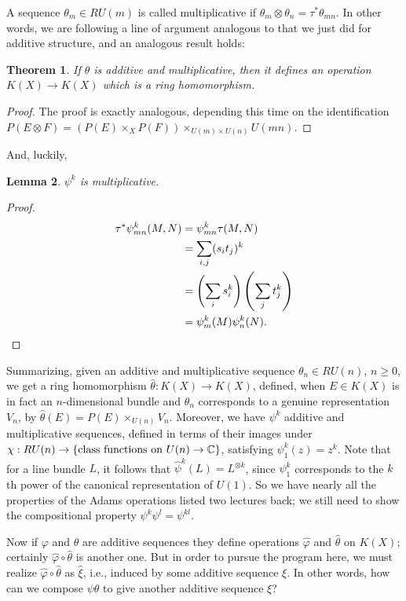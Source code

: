 \documentclass{article}
\newcommand{\C}{\mathbb{C}}
\newtheorem{thm}{Theorem}[section]
\newtheorem{lem}[thm]{Lemma}
\begin{document}
A sequence $\theta_m \in RU(m)$ is called multiplicative if $\theta_m \otimes \theta_n = \tau^* \theta_{mn}$.  In other words, we are following a line of argument analogous to that we just did for additive structure, and an analogous result holds:
\begin{thm}
If $\theta$ is additive and multiplicative, then it defines an operation $K(X) \to K(X)$ which is a ring homomorphism.
\end{thm}
\begin{proof}
The proof is exactly analogous, depending this time on the identification $P(E \otimes F) = (P(E) \times_X P(F)) \times_{U(m) \times U(n)} U(mn)$.
\end{proof}

And, luckily,
\begin{lem}
$\psi^k$ is multiplicative.
\end{lem}
\begin{proof}
\begin{align*}
\tau^* \psi^k_{mn}(M, N) & = \psi^k_{mn} \tau(M, N) \\
& = \sum_{i, j}(s_i t_j)^k \\
& = \left( \sum_i s_i^k \right) \left( \sum_j t_j^k \right) \\
& = \psi^k_m(M) \psi^k_n(N).\qedhere
\end{align*}
\end{proof}

Summarizing, given an additive and multiplicative sequence $\theta_n \in RU(n)$, $n \ge 0$, we get a ring homomorphism $\hat \theta: K(X) \to K(X)$, defined, when $E \in K(X)$ is in fact an $n$-dimensional bundle and $\theta_n$ corresponds to a genuine representation $V_n$, by $\hat \theta(E) = P(E) \times_{U(n)} V_n$.  Moreover, we have $\psi^k$ additive and multiplicative sequences, defined in terms of their images under $\chi: RU(n) \to \{\hbox{class functions on $U(n) \to \C$}\}$, satisfying $\psi^k_1(z) = z^k$.  Note that for a line bundle $L$, it follows that $\hat \psi^k(L) = L^{\otimes k}$, since $\psi^k_1$ corresponds to the $k$th power of the canonical representation of $U(1)$.  So we have nearly all the properties of the Adams operations listed two lectures back; we still need to show the compositional property $\psi^k \psi^l = \psi^{kl}$.

Now if $\varphi$ and $\theta$ are additive sequences they define operations $\hat \varphi$ and $\hat \theta$ on $K(X)$; certainly $\hat \varphi \circ \hat \theta$ is another one.  But in order to pursue the program here, we must realize $\hat \varphi \circ \hat \theta$ as $\hat \xi$, i.e., induced by some additive sequence $\xi$.  In other words, how can we compose $\psi \theta$ to give another additive sequence $\xi$?
\end{document}
